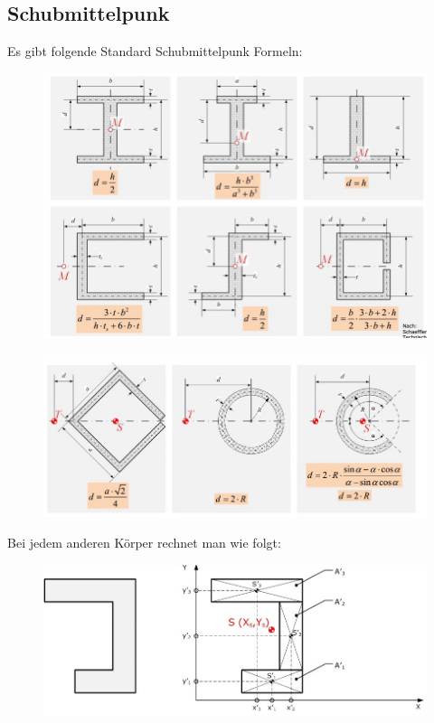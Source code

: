 \subsection*{Schubmittelpunk}


Es gibt folgende Standard Schubmittelpunk Formeln:

\begin{figure}[h]
	\centering
	\includegraphics[scale=0.7]{Schubmittelpunk_1.jpg}
\end{figure}

\begin{figure}[h]
	\centering
	\includegraphics[scale=0.7]{Schubmittelpunk_2.jpg}
\end{figure}

\newpage

Bei jedem anderen Körper rechnet man wie folgt:

\begin{figure}[h]
	\centering
	\includegraphics[scale=0.7]{Schubmittelpunk_Rechnung.jpg}
\end{figure}

